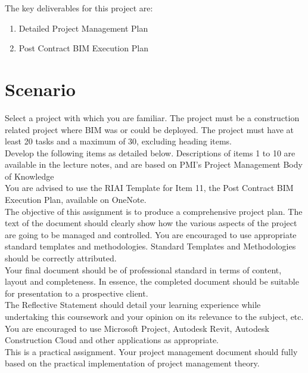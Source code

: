 The key deliverables for this project are:

\begin{enumerate}
	\item Detailed Project Management Plan 
	\item Post Contract BIM Execution Plan
\end{enumerate}


\section*{Scenario}

Select a project with which you are familiar. The project must be a construction related project where BIM was or could be deployed.  The project must have at least 20 tasks and a maximum of 30, excluding heading items.\\

Develop the following items as detailed below. Descriptions of items 1 to 10 are available in the lecture notes, and are based on PMI's Project Management Body of Knowledge\\

You are advised to use the RIAI Template for Item 11, the Post Contract BIM Execution Plan, available on OneNote.\\

The objective of this assignment is to produce a comprehensive project plan. The text of the document should clearly show how the various aspects of the project are going to be managed and controlled. You are encouraged to use appropriate standard templates and methodologies.  Standard Templates and Methodologies should be correctly attributed.\\

Your final document should be of professional standard in terms of content, layout and completeness. In essence, the completed document should be suitable for presentation to a prospective client.\\

The Reflective Statement should detail your learning experience while undertaking this coursework and your opinion on its relevance to the subject, etc.\\

You are encouraged to use Microsoft Project, Autodesk Revit, Autodesk Construction Cloud and other applications as appropriate.\\

This is a practical assignment. Your project management document should fully based on the practical implementation of project management theory.\\


